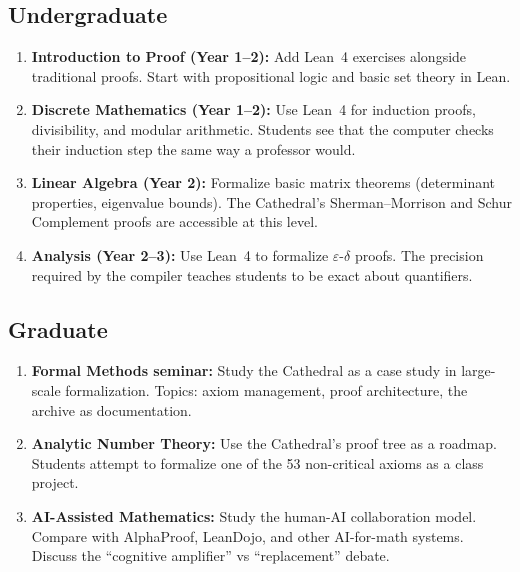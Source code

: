 \documentclass[11pt,a4paper]{article}
\begin{document}
\subsection{Undergraduate}

\begin{enumerate}
  \item \textbf{Introduction to Proof (Year 1--2):} Add Lean~4
    exercises alongside traditional proofs. Start with propositional
    logic and basic set theory in Lean.

  \item \textbf{Discrete Mathematics (Year 1--2):} Use Lean~4 for
    induction proofs, divisibility, and modular arithmetic.
    Students see that the computer checks their induction step
    the same way a professor would.

  \item \textbf{Linear Algebra (Year 2):} Formalize basic matrix
    theorems (determinant properties, eigenvalue bounds). The
    Cathedral's Sherman--Morrison and Schur Complement proofs
    are accessible at this level.

  \item \textbf{Analysis (Year 2--3):} Use Lean~4 to formalize
    $\varepsilon$-$\delta$ proofs. The precision required by the
    compiler teaches students to be exact about quantifiers.
\end{enumerate}

\subsection{Graduate}

\begin{enumerate}
  \item \textbf{Formal Methods seminar:} Study the Cathedral as
    a case study in large-scale formalization. Topics:
    axiom management, proof architecture, the archive as
    documentation.

  \item \textbf{Analytic Number Theory:} Use the Cathedral's
    proof tree as a roadmap. Students attempt to formalize
    one of the 53 non-critical axioms as a class project.

  \item \textbf{AI-Assisted Mathematics:} Study the human-AI
    collaboration model. Compare with AlphaProof, LeanDojo,
    and other AI-for-math systems. Discuss the ``cognitive
    amplifier'' vs ``replacement'' debate.
\end{enumerate}
\end{document}

